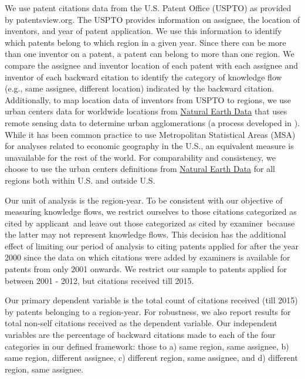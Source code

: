 \documentclass[12pt,letterpaper]{article}
\begin{document}
We use patent citations data from the U.S. Patent Office (USPTO) as provided by patentsview.org. The USPTO provides information on assignee, the location of inventors, and year of patent application. We use this information to identify which patents belong to which region in a given year. Since there can be more than one inventor on a patent, a patent can belong to more than one region. We compare the assignee and inventor location of each patent with each assignee and inventor of each backward citation  to identify the category of knowledge flow (e.g., same assignee, different location) indicated by the backward citation. Additionally, to map location data of inventors from USPTO to regions, we use urban centers data for worldwide locations from \href{http://www.naturalearthdata.com/downloads/10m-cultural-vectors/}{Natural Earth Data} that uses remote sensing data to determine urban agglomerations (a process developed in \citet*{Schneider2003}).  While it has been common practice to use Metropolitan Statistical Areas (MSA) for analyses related to economic geography in the U.S., an equivalent measure is unavailable for the rest of the world. For comparability and consistency, we choose to use the urban centers definitions from \href{http://www.naturalearthdata.com/downloads/10m-cultural-vectors/}{Natural Earth Data} for all regions both within U.S. and outside U.S. \par
Our unit of analysis is the region-year. To be consistent with our objective of measuring knowledge flows, we restrict ourselves to those citations categorized as \textquotesingle cited by applicant\textquotesingle \ and leave out those categorized as \textquotesingle cited by examiner\textquotesingle \ because the latter may not represent knowledge flows. This decision has the additional effect of limiting our period of analysis to citing patents applied for after the year 2000 since the data on which citations were added by examiners is available for patents from only 2001 onwards. We restrict our sample to patents applied for between 2001 - 2012, but citations received till 2015. \par
Our primary dependent variable is the  total count of citations received (till 2015) by patents belonging to a region-year. For robustness, we also report results for total non-self citations received as the dependent variable. Our independent variables are the percentage of backward citations made to each of the four categories in our defined framework: those to a) same region, same assignee, b) same region, different assignee, c) different region, same assignee, and d) different region, same assignee. \par
\end{document}

